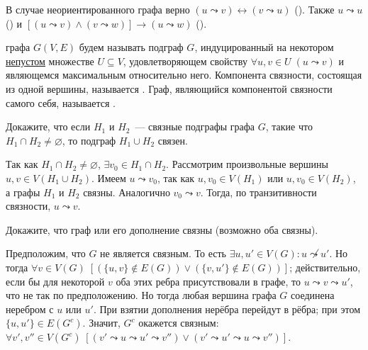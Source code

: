 \begin{remark}
    \label{remark:graphs:connectivity_relation}
    В случае неориентированного графа верно $ (u \leadsto v) \leftrightarrow (v \leadsto u) $ ().
    Также $ u \leadsto u $ () и $ \left[ (u \leadsto v) \wedge (v \leadsto w) \right] \rightarrow (u \leadsto w) $ ().
\end{remark}

\begin{definition}
    \label{definition:graphs:connectivity_component}
     графа $ G(V, E) $ будем называть подграф $ G $, индуцированный на некотором \underline{непустом} множестве $ U \subseteq V $,
    удовлетворяющем свойству $ \forall u, v \in U \; (u \leadsto v) $ и являющемся максимальным относительно него.
    \newline
    Компонента связности, состоящая из одной вершины, называется .
    \newline
    Граф, являющийся компонентой связности самого себя, называется .
\end{definition}


\begin{Exercise}[counter=SecExercise]
    \noindent
    Докажите, что если $ H_1 $ и $ H_2 $~--- связные подграфы графа $ G $,
    такие что $ H_1 \cap H_2 \neq \varnothing $, то подграф $ H_1 \cup H_2 $ связен.
\end{Exercise}

\begin{Answer}
    \noindent
    Так как $ H_1 \cap H_2 \neq \varnothing $, $ \exists v_0 \in H_1 \cap H_2 $.
    Рассмотрим произвольные вершины $ u, v \in V(H_1 \cup H_2) $.
    Имеем $ u \leadsto v_0 $, так как $ u, v_0 \in V(H_1) $ или $ u, v_0 \in V(H_2) $,
    а графы $ H_1 $ и $ H_2 $ связны.
    Аналогично $ v_0 \leadsto v $.
    Тогда, по транзитивности связности, $ u \leadsto v $.
\end{Answer}


\begin{Exercise}[counter=SecExercise]
    \noindent
    Докажите, что граф или его дополнение связны (возможно оба связны).
\end{Exercise}

\begin{Answer}
    \noindent
    Предположим, что $ G $ не является связным.
    То есть $ \exists u, u' \in V(G): u \not\leadsto u' $.
    Но тогда $ \forall v \in V(G) \; \left[ (\{u, v\} \notin E(G)) \vee (\{v, u'\} \notin E(G)) \right] $;
    действительно, если бы для некоторой $ v $ оба этих ребра присутствовали в графе, то $ u \leadsto v \leadsto u' $,
    что не так по предположению.
    Но тогда любая вершина графа $ G $ соединена неребром с $ u $ или $ u' $.
    При взятии дополнения нерёбра перейдут в рёбра;
    при этом $ \{u, u'\} \in E(G^c) $.
    Значит, $ G^c $ окажется связным: $ \forall v', v'' \in V(G^c) \; \left[ (v' \leadsto u \leadsto u' \leadsto v'') \vee (v' \leadsto u' \leadsto u \leadsto v'') \right] $.
\end{Answer}


